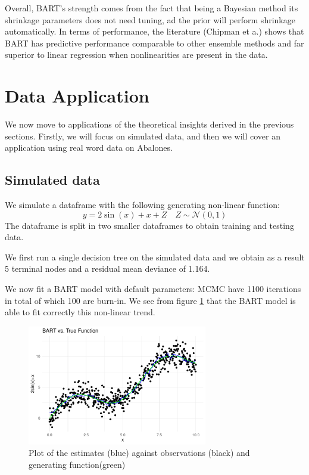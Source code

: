 \documentclass[a4paper,11pt]{article}
\begin{document}
Overall, BART's strength comes from the fact that being a Bayesian method its shrinkage parameters does not need tuning, ad the prior will perform shrinkage automatically. In terms of performance, the literature (Chipman et a.) shows that BART has predictive performance comparable to other ensemble methods and far superior to linear regression when nonlinearities are present in the data. 

  
\section{Data Application}
\label{data_app}

We now move to applications of the theoretical insights derived in the previous sections. Firstly, we will focus on simulated data, and then we will cover an application using real word data on Abalones.

\subsection{Simulated data}
We simulate a dataframe with the following generating non-linear function:
\begin{equation}
  y = 2\sin(x)+x+Z \quad Z \sim \mathcal{N}(0,1)
\end{equation}
The dataframe is split in two smaller dataframes to obtain training and testing data.

We first run a single decision tree on the simulated data and we obtain as a result 5 terminal nodes and a 
residual mean deviance of 1.164. 

We now fit a BART model with default parameters:  MCMC have 1100 iterations in total of which 100 are burn-in. We see from figure \ref{plot_sin1} that the BART model is able to fit correctly this non-linear trend.

\begin{figure}
  \centering
  \includegraphics[width=0.7\textwidth]{outputs/sin_plot.pdf}
  \caption{Plot of the estimates (blue) against observations (black) and generating function(green)}
  \label{plot_sin1}
\end{figure}
\end{document}
